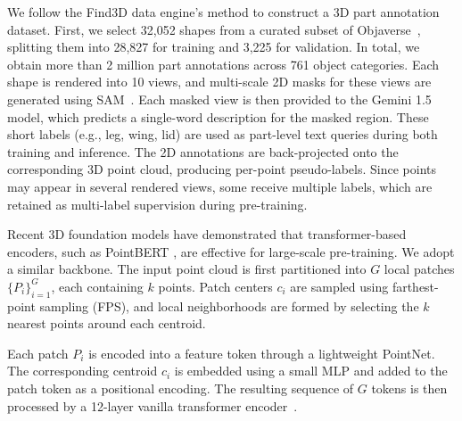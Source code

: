 We follow the Find3D \cite{ma2025find} data engine's method to construct a 3D part annotation dataset. First, we select 32,052 shapes from a curated subset of Objaverse~\cite{deitke2023objaverse}, splitting them into 28,827 for training and 3,225 for validation. In total, we obtain more than 2 million part annotations across 761 object categories.
Each shape is rendered into 10 views, and multi-scale 2D masks for these views are generated using SAM~\cite{kirillov2023segment}.
Each masked view is then provided to the Gemini 1.5 \cite{team2023gemini} model, which predicts a single-word description for the masked region. These short labels (e.g., leg, wing, lid) are used as part-level text queries during both training and inference.
The 2D annotations are back-projected onto the corresponding 3D point cloud, producing per-point pseudo-labels.
Since points may appear in several rendered views, some receive multiple labels, which are retained as multi-label supervision during pre-training. 

Recent 3D foundation models \cite{xue2023ulip,liu2023openshape,zhou2023uni3d}
have demonstrated that transformer-based encoders, such as PointBERT \cite{yu2022point}, are effective for large-scale pre-training. We adopt a similar backbone.
The input point cloud is first partitioned into $G$ local patches $\{P_i\}_{i=1}^{G}$, each containing $k$ points. Patch centers ${c_i}$ are sampled using farthest-point sampling (FPS), and local neighborhoods are formed by selecting the $k$ nearest points around each centroid.

Each patch $P_i$ is encoded into a feature token through a lightweight PointNet. The corresponding centroid $c_i$ is embedded using a small MLP and added to the patch token as a positional encoding. The resulting sequence of $G$ tokens is then processed by a 12-layer vanilla transformer encoder~\cite{vaswani2017attention}.


